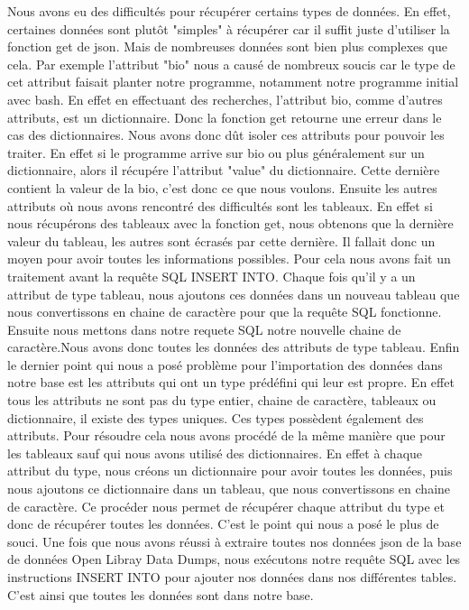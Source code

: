 \documentclass[12pt, a4paper]{article}
\begin{document}
Nous avons eu des difficultés pour récupérer certains types de données. En effet, certaines données sont plutôt "simples" à récupérer car il suffit juste d'utiliser la fonction get de json. Mais de nombreuses données sont bien plus complexes que cela. Par exemple l'attribut "bio" nous a causé de nombreux soucis car le type de cet attribut faisait planter notre programme, notamment notre programme initial avec bash. En effet en effectuant des recherches, l'attribut bio, comme d'autres attributs, est un dictionnaire. Donc la fonction get retourne une erreur dans le cas des dictionnaires. Nous avons donc dût isoler ces attributs pour pouvoir les traiter. En effet si le programme arrive sur bio ou plus généralement sur un dictionnaire, alors il récupére l'attribut "value" du dictionnaire. Cette dernière contient la valeur de la bio, c'est donc ce que nous voulons. Ensuite les autres attributs où nous avons rencontré des difficultés sont les tableaux. En effet si nous récupérons des tableaux avec la fonction get, nous obtenons que la dernière valeur du tableau, les autres sont écrasés par cette dernière. Il fallait donc un moyen pour avoir toutes les informations possibles. Pour cela nous avons fait un traitement avant la requête SQL INSERT INTO. Chaque fois qu'il y a un attribut de type tableau, nous ajoutons ces données dans un nouveau tableau que nous convertissons en chaine de caractère pour que la requête SQL fonctionne. Ensuite nous mettons dans notre requete SQL notre nouvelle chaine de caractère.Nous avons donc toutes les données des attributs de type tableau. Enfin le dernier point qui nous a posé problème pour l'importation des données dans notre base est les attributs qui ont un type prédéfini qui leur est propre. En effet tous les attributs ne sont pas du type entier, chaine de caractère, tableaux ou dictionnaire, il existe des types uniques. Ces types possèdent également des attributs. Pour résoudre cela nous avons procédé de la même manière que pour les tableaux sauf qui nous avons utilisé des dictionnaires. En effet à chaque attribut du type, nous créons un dictionnaire pour avoir toutes les données, puis nous ajoutons ce dictionnaire dans un tableau, que nous convertissons en chaine de caractère. Ce procéder nous permet de récupérer chaque attribut du type et donc de récupérer toutes les données. C'est le point qui nous a posé le plus de souci. Une fois que nous avons réussi à extraire toutes nos données json de la base de données Open Libray Data Dumps, nous exécutons notre requête SQL avec les instructions INSERT INTO pour ajouter nos données dans nos différentes tables. C'est ainsi que toutes les données sont dans notre base.
\end{document}
